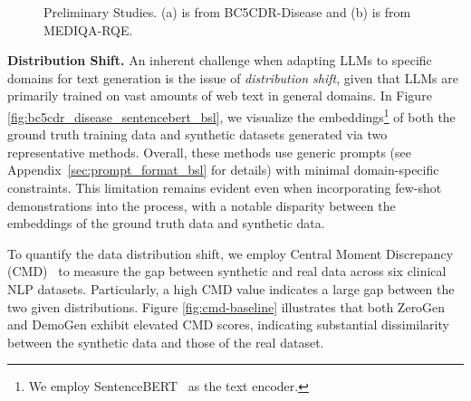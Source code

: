 \begin{figure}
	\centering
	\vspace{-3ex}
         \hspace{-2.3ex}
	\caption{Preliminary Studies. (a) is from BC5CDR-Disease and (b) is from MEDIQA-RQE.\vspace{-1ex}}
	\vspace{-1ex}
\label{fig:prelim1}
\end{figure}



\textbf{Distribution Shift.} An inherent challenge when adapting LLMs to specific domains for text generation is the issue of \emph{distribution shift}, given that LLMs are primarily trained on vast amounts of web text in general domains. In Figure \ref{fig:bc5cdr_disease_sentencebert_bsl}, we visualize the embeddings\footnote{We employ SentenceBERT~\citep{reimers2019sentence} as the text encoder.} of both the ground truth training data and synthetic datasets generated via two representative methods. Overall, these methods use generic prompts (see Appendix~\ref{sec:prompt_format_bsl} for details) with minimal domain-specific constraints.
This limitation remains evident even when incorporating few-shot demonstrations into the process, with a notable disparity between the embeddings of the ground truth data and synthetic data.

To quantify the data distribution shift, we employ Central Moment Discrepancy (CMD)~\citep{zellinger2017central} to measure the gap between synthetic and real data across six clinical NLP datasets. Particularly, a high CMD value indicates a large gap between the two given distributions. Figure \ref{fig:cmd-baseline} illustrates that both ZeroGen and DemoGen exhibit elevated CMD scores, indicating substantial dissimilarity between the synthetic data and those of the real dataset.

